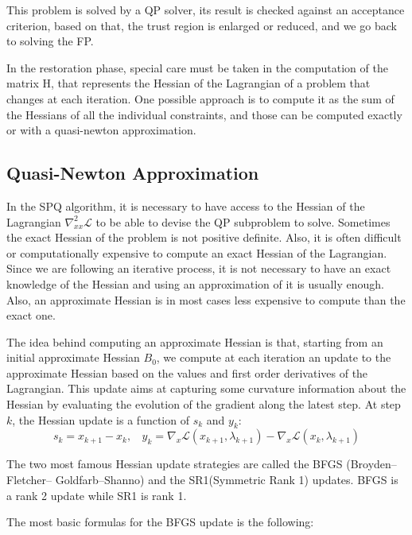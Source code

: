 This problem is solved by a QP solver, its result is checked against an acceptance criterion, based on that, the trust region is enlarged or reduced, and we go back to solving the FP\@.

In the restoration phase, special care must be taken in the computation of the matrix H, that represents the Hessian of the Lagrangian of a problem that changes at each iteration.
One possible approach is to compute it as the sum of the Hessians of all the individual constraints, and those can be computed exactly or with a quasi-newton approximation.


\subsection{Quasi-Newton Approximation}
\label{sub:quasi_newton_approximation}

In the SPQ algorithm, it is necessary to have access to the Hessian of the Lagrangian $\nabla_{xx}^2\mathcal{L}$ to be able to devise the QP subproblem to solve.
Sometimes the exact Hessian of the problem is not positive definite.
Also, it is often difficult or computationally expensive to compute an exact Hessian of the Lagrangian.
Since we are following an iterative process, it is not necessary to have an exact knowledge of the Hessian and using an approximation of it is usually enough.
Also, an approximate Hessian is in most cases less expensive to compute than the exact one.

The idea behind computing an approximate Hessian is that, starting from an initial approximate Hessian $B_0$, we compute at each iteration an update to the approximate Hessian based on the values and first order derivatives of the Lagrangian.
This update aims at capturing some curvature information about the Hessian by evaluating the evolution of the gradient along the latest step.
At step $k$, the Hessian update is a function of $s_k$ and $y_k$:
\begin{equation}
  s_k = x_{k+1}-x_k,\ \ \ \
  y_k = \nabla_x\mathcal{L}(x_{k+1}, \lambda_{k+1}) - \nabla_x\mathcal{L}(x_{k}, \lambda_{k+1})
\end{equation}

The two most famous Hessian update strategies are called the BFGS (Broyden–Fletcher– Goldfarb–Shanno) and the SR1(Symmetric Rank 1) updates.
BFGS is a rank 2 update while SR1 is rank 1.

The most basic formulas for the BFGS update is the following:

